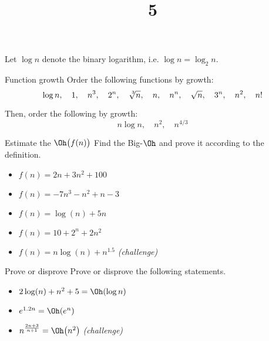 \documentclass{practice}
\title{5}
\date{\DTMdate{2024-10-09}}
\begin{document}
\maketitle

Let $\log{n}$ denote the binary logarithm, i.e. $\log{n} = \log_2{n}$.

\begin{task}{Function growth}
  Order the following functions by growth:
  \[
    \log n,\quad
    1,\quad
    n^3,\quad
    2^n,\quad
    \sqrt[\leftroot{-2}\uproot{2}3]{n},\quad
    n,\quad
    n^n,\quad
    \sqrt{n},\quad
    3^n,\quad
    n^2,\quad
    n!
  \]

  Then, order the following by growth:
  \[
    n \log n,\quad
    n^2,\quad
    n^{4/3}
  \]
\end{task}

\begin{task}{Estimate the $\Oh\bigl(f(n)\bigr)$}
  Find the Big-$\Oh$ and prove it according to the definition.
  \begin{itemize}
    \item $f(n) = 2n + 3n^2 + 100$
    \item $f(n) = -7n^3 - n^2 + n - 3$
    \item $f(n) = \log(n) + 5n$
    \item $f(n) = 10 + 2^n + 2n^2$
    \item $f(n) = n \log(n) + n^{1.5}$ \textit{(challenge)}
  \end{itemize}
\end{task}

\begin{task}{Prove or disprove}
  Prove or disprove the following statements.
  \begin{itemize}
    \item $2\log(n) + n^2 +5 = \Oh(\log{n})$
    \item $e^{1.2n} = \Oh(e^n)$
    \item $n^{\frac{2n + 3}{n+1}} = \Oh\bigl(n^2\bigr)$ \textit{(challenge)}
  \end{itemize}
\end{task}
\end{document}
